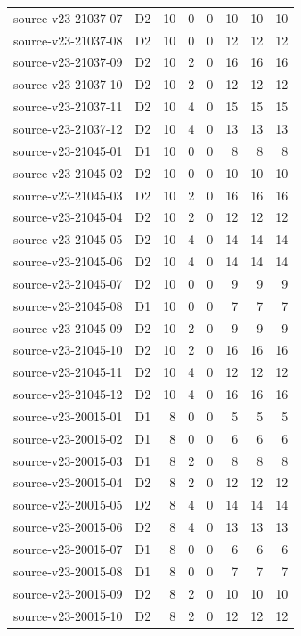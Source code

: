 \begin{longtable}{p{}lrrrrrr}
source-v23-21037-07 & D2 & 10 & 0 & 0 & 10 & 10 & 10\\
source-v23-21037-08 & D2 & 10 & 0 & 0 & 12 & 12 & 12\\
source-v23-21037-09 & D2 & 10 & 2 & 0 & 16 & 16 & 16\\
source-v23-21037-10 & D2 & 10 & 2 & 0 & 12 & 12 & 12\\
source-v23-21037-11 & D2 & 10 & 4 & 0 & 15 & 15 & 15\\
source-v23-21037-12 & D2 & 10 & 4 & 0 & 13 & 13 & 13\\
source-v23-21045-01 & D1 & 10 & 0 & 0 & 8 & 8 & 8\\
source-v23-21045-02 & D2 & 10 & 0 & 0 & 10 & 10 & 10\\
source-v23-21045-03 & D2 & 10 & 2 & 0 & 16 & 16 & 16\\
source-v23-21045-04 & D2 & 10 & 2 & 0 & 12 & 12 & 12\\
source-v23-21045-05 & D2 & 10 & 4 & 0 & 14 & 14 & 14\\
source-v23-21045-06 & D2 & 10 & 4 & 0 & 14 & 14 & 14\\
source-v23-21045-07 & D2 & 10 & 0 & 0 & 9 & 9 & 9\\
source-v23-21045-08 & D1 & 10 & 0 & 0 & 7 & 7 & 7\\
source-v23-21045-09 & D2 & 10 & 2 & 0 & 9 & 9 & 9\\
source-v23-21045-10 & D2 & 10 & 2 & 0 & 16 & 16 & 16\\
source-v23-21045-11 & D2 & 10 & 4 & 0 & 12 & 12 & 12\\
source-v23-21045-12 & D2 & 10 & 4 & 0 & 16 & 16 & 16\\
source-v23-20015-01 & D1 & 8 & 0 & 0 & 5 & 5 & 5\\
source-v23-20015-02 & D1 & 8 & 0 & 0 & 6 & 6 & 6\\
source-v23-20015-03 & D1 & 8 & 2 & 0 & 8 & 8 & 8\\
source-v23-20015-04 & D2 & 8 & 2 & 0 & 12 & 12 & 12\\
source-v23-20015-05 & D2 & 8 & 4 & 0 & 14 & 14 & 14\\
source-v23-20015-06 & D2 & 8 & 4 & 0 & 13 & 13 & 13\\
source-v23-20015-07 & D1 & 8 & 0 & 0 & 6 & 6 & 6\\
source-v23-20015-08 & D1 & 8 & 0 & 0 & 7 & 7 & 7\\
source-v23-20015-09 & D2 & 8 & 2 & 0 & 10 & 10 & 10\\
source-v23-20015-10 & D2 & 8 & 2 & 0 & 12 & 12 & 12\\

\end{longtable}
